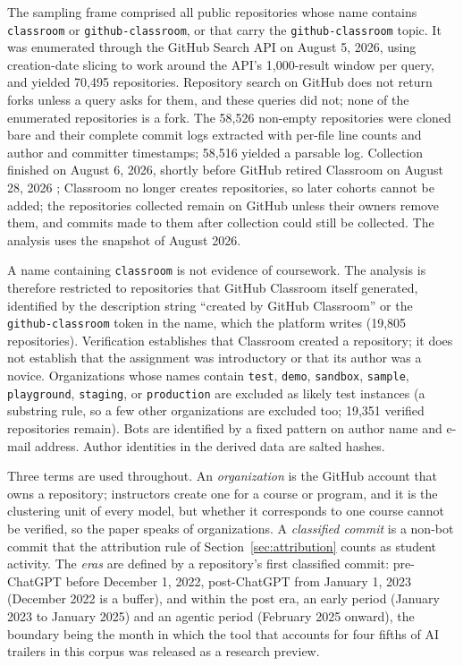 \documentclass[acmsmall,screen,review,anonymous]{acmart}
\begin{document}
The sampling frame comprised all public repositories whose name contains \texttt{classroom} or \texttt{github-}\allowbreak\texttt{classroom}, or that carry the \texttt{github-}\allowbreak\texttt{classroom} topic. It was enumerated through the GitHub Search API on August 5, 2026, using creation-date slicing to work around the API's 1,000-result window per query, and yielded 70,495 repositories. Repository search on GitHub does not return forks unless a query asks for them, and these queries did not; none of the enumerated repositories is a fork. The 58,526 non-empty repositories were cloned bare and their complete commit logs extracted with per-file line counts and author and committer timestamps; 58,516 yielded a parsable log. Collection finished on August 6, 2026, shortly before GitHub retired Classroom on August 28, 2026 \citep{github2026classroomdeprecated}; Classroom no longer creates repositories, so later cohorts cannot be added; the repositories collected remain on GitHub unless their owners remove them, and commits made to them after collection could still be collected. The analysis uses the snapshot of August 2026.

A name containing \texttt{classroom} is not evidence of coursework. The analysis is therefore restricted to repositories that GitHub Classroom itself generated, identified by the description string ``created by GitHub Classroom'' or the \texttt{github-classroom} token in the name, which the platform writes (19,805 repositories). Verification establishes that Classroom created a repository; it does not establish that the assignment was introductory or that its author was a novice. Organizations whose names contain \texttt{test}, \texttt{demo}, \texttt{sandbox}, \texttt{sample}, \texttt{playground}, \texttt{staging}, or \texttt{production} are excluded as likely test instances (a substring rule, so a few other organizations are excluded too; 19,351 verified repositories remain). Bots are identified by a fixed pattern on author name and e-mail address. Author identities in the derived data are salted hashes.

Three terms are used throughout. An \textit{organization} is the GitHub account that owns a repository; instructors create one for a course or program, and it is the clustering unit of every model, but whether it corresponds to one course cannot be verified, so the paper speaks of organizations. A \textit{classified commit} is a non-bot commit that the attribution rule of Section~\ref{sec:attribution} counts as student activity. The \textit{eras} are defined by a repository's first classified commit: pre-ChatGPT before December 1, 2022, post-ChatGPT from January 1, 2023 (December 2022 is a buffer), and within the post era, an early period (January 2023 to January 2025) and an agentic period (February 2025 onward), the boundary being the month in which the tool that accounts for four fifths of AI trailers in this corpus was released as a research preview.
\end{document}
